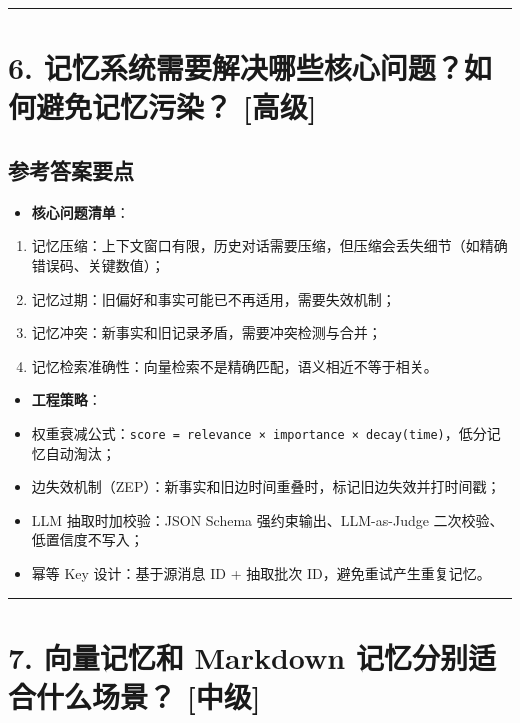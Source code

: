 \documentclass[9pt,a4paper,twocolumn]{ctexart}
\newcommand{\lvzhong}{\usebox{\badgezhongbox}}
\newcommand{\lvgao}{\usebox{\badgegaobox}}
\def\lvzhong{[中级]}%
\def\lvgao{[高级]}%
\begin{document}
\vspace{2pt}
\noindent\rule{\columnwidth}{0.3pt}\vspace{2pt}



\section*{6. 记忆系统需要解决哪些核心问题？如何避免记忆污染？ \lvgao{}}


\subsection*{参考答案要点}

\begin{itemize}[itemsep=1pt, topsep=2pt]
  \item \textbf{核心问题清单}：
\end{itemize}
\begin{enumerate}[itemsep=1pt, topsep=2pt]
  \item 记忆压缩：上下文窗口有限，历史对话需要压缩，但压缩会丢失细节（如精确错误码、关键数值）；
  \item 记忆过期：旧偏好和事实可能已不再适用，需要失效机制；
  \item 记忆冲突：新事实和旧记录矛盾，需要冲突检测与合并；
  \item 记忆检索准确性：向量检索不是精确匹配，语义相近不等于相关。
\end{enumerate}
\begin{itemize}[itemsep=1pt, topsep=2pt]
  \item \textbf{工程策略}：
  \item 权重衰减公式：\texttt{score = relevance × importance × decay(time)}，低分记忆自动淘汰；
  \item 边失效机制（ZEP）：新事实和旧边时间重叠时，标记旧边失效并打时间戳；
  \item LLM 抽取时加校验：JSON Schema 强约束输出、LLM-as-Judge 二次校验、低置信度不写入；
  \item 幂等 Key 设计：基于源消息 ID + 抽取批次 ID，避免重试产生重复记忆。
\end{itemize}


\vspace{2pt}
\noindent\rule{\columnwidth}{0.3pt}\vspace{2pt}



\section*{7. 向量记忆和 Markdown 记忆分别适合什么场景？ \lvzhong{}}
\end{document}
